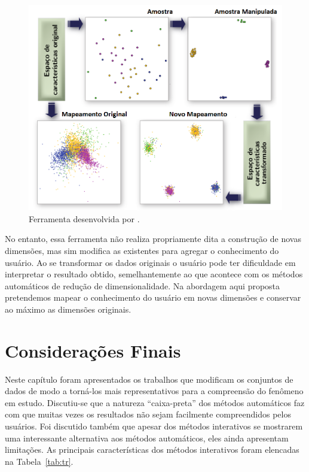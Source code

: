 \begin{figure}[h!]
    \centering
    \includegraphics[width=16cm]{images/ud.png}
    \caption{Ferramenta desenvolvida por \cite{Gladys2013}.}
    \label{fig:ud}
\end{figure}

No entanto, essa ferramenta não realiza propriamente dita a
construção de novas dimensões, mas sim modifica as
existentes para agregar o conhecimento do usuário. Ao se
transformar os dados originais o usuário pode ter
dificuldade em interpretar o resultado obtido,
semelhantemente ao que acontece com os métodos automáticos
de redução de dimensionalidade.  Na abordagem aqui proposta
pretendemos mapear o conhecimento do usuário em novas
dimensões e conservar ao máximo as dimensões originais.

\section{Considerações Finais}

Neste capítulo foram apresentados os trabalhos que modificam
os conjuntos de dados de modo a torná-los mais
representativos para a compreensão do fenômeno em estudo.
Discutiu-se que a natureza ``caixa-preta'' dos métodos
automáticos faz com que muitas vezes os resultados não sejam
facilmente compreendidos pelos usuários. Foi discutido também que
apesar dos métodos interativos se mostrarem uma
interessante alternativa aos métodos automáticos, eles ainda
apresentam limitações. As principais características dos
métodos interativos foram elencadas na Tabela~\ref{tab:tr}.

